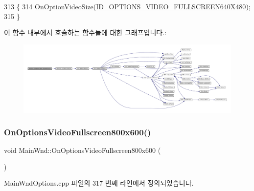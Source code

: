 \begin{DoxyCode}
313 \{
314   \mbox{\hyperlink{class_main_wnd_a3db1b6ad5af63ac2c3476868c015f6aa}{OnOptionVideoSize}}(\mbox{\hyperlink{resource_8h_ac81791f4a3ae411e197f852faa32a9d9}{ID\_OPTIONS\_VIDEO\_FULLSCREEN640X480}});
315 \}
\end{DoxyCode}
이 함수 내부에서 호출하는 함수들에 대한 그래프입니다.\+:
\nopagebreak
\begin{figure}[H]
\begin{center}
\leavevmode
\includegraphics[width=350pt]{class_main_wnd_ae205b52e438eb0305310ca81436967db_cgraph}
\end{center}
\end{figure}
\mbox{\label{class_main_wnd_a2b287efa1b6df3057aedd5e5e6a85d6e}} 
\subsubsection{\texorpdfstring{On\+Options\+Video\+Fullscreen800x600()}{OnOptionsVideoFullscreen800x600()}}
{\footnotesize\ttfamily void Main\+Wnd\+::\+On\+Options\+Video\+Fullscreen800x600 (\begin{DoxyParamCaption}{ }\end{DoxyParamCaption})\hspace{0.3cm}{\ttfamily [protected]}}



Main\+Wnd\+Options.\+cpp 파일의 317 번째 라인에서 정의되었습니다.


